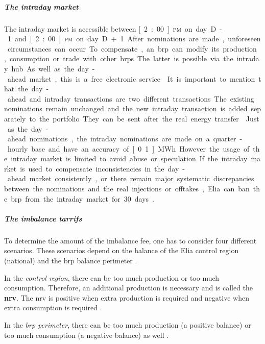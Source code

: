 \subparagraph{The intraday market}

The intraday market is accessible between \unit[2:00]{\textsc{pm}} on day D-1 and \unit[2:00]{\textsc{pm}} on day D+1. After nominations are made, unforeseen circumstances can occur. To compensate, an \gls{brp} can modify its production, consumption or trade with other \glspl{brp}. The latter is possible via the intraday hub. As well as the day-ahead market, this is a free electronic service \cite{EliaI}.

It is important to mention that the day-ahead and intraday transactions are two different transactions. The existing nominations remain unchanged and the new intraday transaction is added separately to the portfolio. They can be sent after the real energy transfer \cite{EliaI}.

Just as the day-ahead nominations, the intraday nominations are made on a quarter-hourly base and have an accuracy of \unit[0.1]{MWh}. However the usage of the intraday market is limited to avoid abuse or speculation. If the intraday market is used to compensate inconsistencies in the day-ahead market consistently, or there remain major systematic discrepancies between the nominations and the real injections or offtakes, Elia can ban the \gls{brp} from the intraday market for 30 days \cite{EliaI}.

\subparagraph{The imbalance tarrifs}

To determine the amount of the imbalance fee, one has to consider four different scenarios. These scenarios depend on the balance of the Elia control region (national) and the \gls{brp} balance perimeter \cite{EliaIT}.

In the \textit{control region}, there can be too much production or too much consumption. Therefore, an additional production is necessary and is called the \textbf{\gls{nrv}}. The \gls{nrv} is positive when extra production is required and negative when extra consumption is required \cite{EliaIT}.

In the \textit{\gls{brp} perimeter}, there can be too much production (a positive balance) or too much consumption (a negative balance) as well \cite{EliaIT}.

